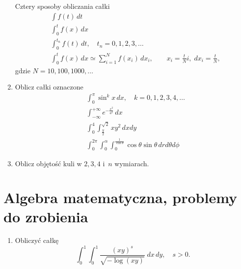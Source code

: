 \documentclass[a4paper,11pt]{article}
\begin{document}
\begin{enumerate}
  Cztery sposoby obliczania całki
  \begin{align}
    &\int f( t ) \, dt \\
    &\int_{ 0 }^{ t } f( x ) \, dx \\
    &\int_{ 0 }^{ t_{ n } } f( t ) \, dt, \quad
      t_{ n } = 0, 1, 2, 3, \ldots \\
    &\int_{ 0 }^{ t } f( x ) \, dx \simeq \sum_{ i = 1 }^{ N } f( x_{ i } ) \, dx_{ i },
      \qquad
      x_{ i } = \frac{ t }{ N } i,\; dx_{ i } = \frac{ t }{ N },
  \end{align}
  gdzie $N = 10, 100, 1000, \ldots$

\item Oblicz całki oznaczone
  \begin{align}
    &\int_{ 0 }^{ \pi } \sin^{ k } x \, dx, \quad
      k = 0, 1, 2, 3, 4, \ldots \\
    &\int_{ -\infty }^{ +\infty } e^{ -\frac{ x^{ 2 } }{ a^{ 2 } } } \, dx \\
    &\int_{ 0 }^{ 4 } \int_{ \frac{ y }{ 2 } }^{ \sqrt{ 2 } } x y^{ 2 } \, dx dy \\
    &\int_{ 0 }^{ 2\pi } \int_{ 0 }^{ \alpha } \int_{ 0 }^{ \frac{ 1 }{ \cos \theta } } \cos\theta \sin\theta \,
      dr d\theta d\phi
  \end{align}

\item Oblicz objętość kuli w $2, 3, 4$ i~$n$ wymiarach.

\end{enumerate}










\section{Algebra matematyczna, problemy do zrobienia}





\begin{enumerate}

\item Obliczyć całkę
  \begin{equation}
    \label{Calculus:01}
    \int_{ 0 }^{ 1 } \int_{ 0 }^{ 1 } \frac{ ( x y )^{ s } }{ \sqrt{-\log( x y ) } }
      \; dx \, dy, \quad
      s > 0.
  \end{equation}



\end{enumerate}
\end{document}
